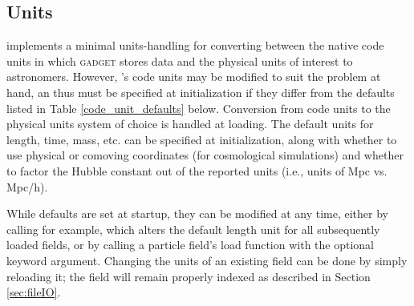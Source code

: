 \subsection{Units}
\label{sec:units}
 implements a minimal units-handling for converting between the native code units in which \textsc{gadget} stores data and the physical units of interest to astronomers.  
However, 's code units may be modified to suit the problem at hand, an thus must be specified at  initialization if they differ from the defaults listed in Table \ref{code_unit_defaults} below.
Conversion from code units to the physical units system of choice is handled at loading.
The default units for length, time, mass, etc. can be specified at initialization, along with whether to use physical or comoving coordinates (for cosmological simulations) and whether to factor the Hubble constant out of the reported units (i.e., units of Mpc vs. Mpc/h).

While defaults are set at startup, they can be modified at any time, either by calling  for example, which alters the default length unit for all subsequently loaded fields, or by calling a particle field's load function with the optional  keyword argument.  
Changing the units of an existing field can be done by simply reloading it; the field will remain properly indexed as described in Section \ref{sec:fileIO}.